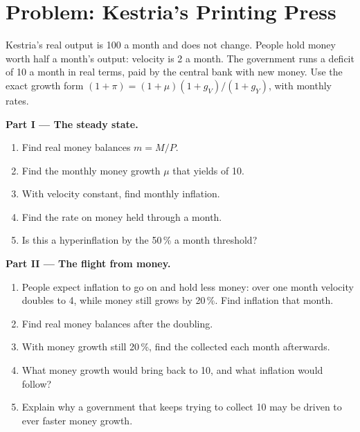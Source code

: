\section{Problem: Kestria's Printing Press}

\begin{problem}
\label{pb:g12:inflation-and-money:1}
Kestria's real output is 100 a month and does not change. People hold money worth half a month's output: velocity is 2 a month. The government runs a deficit of 10 a month
in real terms, paid by the central bank with new money. Use the exact growth form $(1 + \pi) = (1 + \mu)(1 + g_V)/(1 + g_Y)$, with monthly rates.

\medskip
\noindent\textbf{Part I --- The steady state.}
\begin{enumerate}
\item Find real money balances $m = M/P$.
\item Find the monthly money growth $\mu$ that yields  of 10.
\item With velocity constant, find monthly inflation.
\item Find the  rate on money held through a month.
\item Is this a hyperinflation by the 50\,\% a month threshold?
\end{enumerate}

\medskip
\noindent\textbf{Part II --- The flight from money.}
\begin{enumerate}[resume]
\item People expect inflation to go on and hold less money: over one month velocity doubles to 4, while money still grows by 20\,\%. Find inflation that month.
\item Find real money balances after the doubling.
\item With money growth still 20\,\%, find the  collected each month afterwards.
\item What money growth would bring  back to 10, and what inflation would follow?
\item Explain why a government that keeps trying to collect 10 may be driven to ever faster money growth.
\end{enumerate}


\end{problem}
